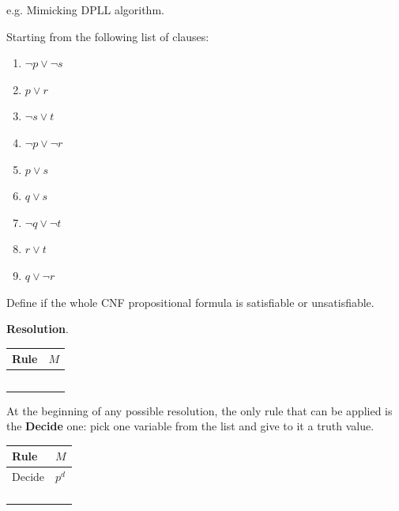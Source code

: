 \begin{example}
    e.g. Mimicking DPLL algorithm. \vspace{7pt}

    Starting from the following list of clauses:
    \begin{enumerate}
        \item $\neg p \lor \neg s$
        \item $p \lor r$
        \item $\neg s \lor t$
        \item $\neg p \lor \neg r$
        \item $p \lor s$
        \item $q \lor s$
        \item $\neg q \lor \neg t$
        \item $r \lor t$
        \item $q \lor \neg r$
    \end{enumerate} \vspace{3.5pt}
    Define if the whole CNF propositional formula is satisfiable or unsatisfiable. \vspace{7pt}

    \textbf{Resolution}. \vspace{7pt}
    \begin{center}
        \begin{tabular}{|p{2.5cm}|p{5cm}|}          
            \hline
                \textbf{Rule} & $M$\\ 
            \hline
                & \\
            \hline
                & \\
            \hline
                & \\
            \hline
                & \\
            \hline
                & \\
            \hline
        \end{tabular}
    \end{center} \vspace{7pt}

    At the beginning of any possible resolution, the only rule that can be applied is the \textbf{Decide} one: pick one variable from the list 
    and give to it a truth value. \vspace{7pt}
    \begin{center}
        \begin{tabular}{|p{2.5cm}|p{5cm}|}          
            \hline
                \textbf{Rule} & $M$\\ 
            \hline
                Decide & $p^d$ \\
            \hline
                & \\
            \hline
                & \\
            \hline
                & \\
            \hline
                & \\
            \hline
        \end{tabular}
    \end{center} \vspace{7pt}


\end{example}
